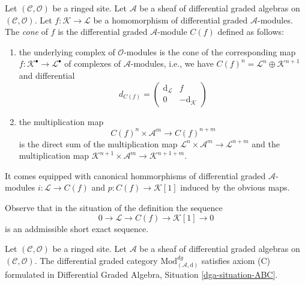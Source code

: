 \begin{definition}
\label{definition-cone}
Let $(\mathcal{C}, \mathcal{O})$ be a ringed site.
Let $\mathcal{A}$ be a sheaf of differential graded algebras
on $(\mathcal{C}, \mathcal{O})$.
Let $f : \mathcal{K} \to \mathcal{L}$
be a homomorphism of differential graded $\mathcal{A}$-modules.
The {\it cone} of $f$ is the differential graded $\mathcal{A}$-module
$C(f)$ defined as follows:
\begin{enumerate}
\item the underlying complex of $\mathcal{O}$-modules
is the cone of the corresponding map
$f : \mathcal{K}^\bullet \to \mathcal{L}^\bullet$ of
complexes of $\mathcal{A}$-modules, i.e., we have
$C(f)^n = \mathcal{L}^n \oplus \mathcal{K}^{n + 1}$ and
differential
$$
d_{C(f)} =
\left(
\begin{matrix}
\text{d}_\mathcal{L} & f \\
0 & -\text{d}_\mathcal{K}
\end{matrix}
\right)
$$
\item the multiplication map
$$
C(f)^n \times \mathcal{A}^m \to C(f)^{n + m}
$$
is the direct sum of the multiplication map
$\mathcal{L}^n \times \mathcal{A}^m \to \mathcal{L}^{n + m}$
and the multiplication map
$\mathcal{K}^{n + 1} \times \mathcal{A}^m \to \mathcal{K}^{n + 1 + m}$.
\end{enumerate}
It comes equipped with canonical hommorphisms of differential graded
$\mathcal{A}$-modules $i : \mathcal{L} \to C(f)$
and $p : C(f) \to \mathcal{K}[1]$ induced by the obvious maps.
\end{definition}

\noindent
Observe that in the situation of the definition the sequence
$$
0 \to \mathcal{L} \to C(f) \to \mathcal{K}[1] \to 0
$$
is an addmissible short exact sequence.

\begin{lemma}
\label{lemma-axiom-C}
Let $(\mathcal{C}, \mathcal{O})$ be a ringed site.
Let $\mathcal{A}$ be a sheaf of differential graded algebras
on $(\mathcal{C}, \mathcal{O})$.
The differential graded category
$\text{Mod}^{dg}_{(\mathcal{A}, \text{d})}$
satisfies axiom (C) formulated in
Differential Graded Algebra, Situation \ref{dga-situation-ABC}.
\end{lemma}


